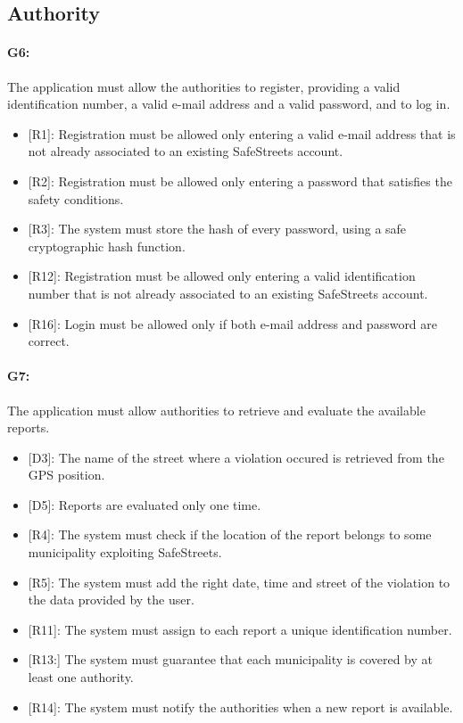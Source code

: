 \documentclass[12pt,a4paper]{report}
\begin{document}
		\subsection{Authority}
			
			\paragraph {G6:} The application must allow the authorities to register, providing a valid identification number, a valid e-mail address and a valid password,
			and to log in.
				\begin{itemize}
					\item{[R1]:} Registration must be allowed only entering a valid e-mail address that is not already associated to an existing SafeStreets account.
					\item{[R2]:} Registration must be allowed only entering a password that satisfies the safety conditions.
					\item{[R3]:} The system must store the hash of every password, using a safe cryptographic hash function.
					\item{[R12]:} Registration must be allowed only entering a valid identification number that is not already associated to an existing SafeStreets account.
					\item{[R16]:} Login must be allowed only if both e-mail address and password are correct.
				\end{itemize}

			\paragraph {G7:} The application must allow authorities to retrieve and evaluate the available reports.
				\begin{itemize}
					\item{[D3]:} The name of the street where a violation occured is retrieved from the GPS position.
					\item{[D5]:} Reports are evaluated only one time.
				\end{itemize}
				\begin{itemize}
					\item{[R4]:} The system must check if the location of the report belongs to some municipality exploiting SafeStreets.
					\item{[R5]:} The system must add the right date, time and street of the violation to the data provided by the user.
					\item{[R11]:} The system must assign to each report a unique identification number.
					\item{[R13:]} The system must guarantee that each municipality is covered by at least one authority.
					\item{[R14]:} The system must notify the authorities when a new report is available.
				\end{itemize}
\end{document}
